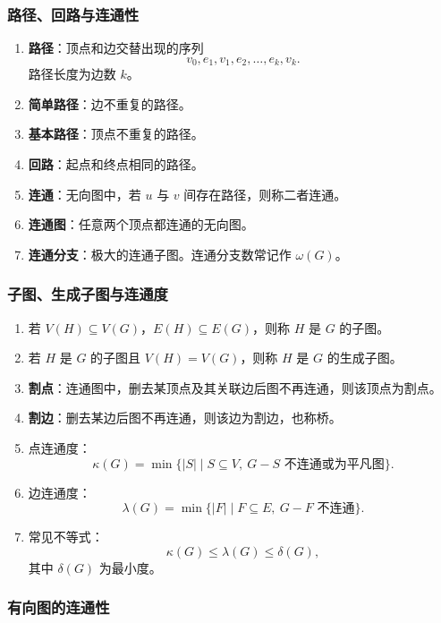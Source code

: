 \subsubsection{路径、回路与连通性}

\begin{enumerate}
	\item \textbf{路径}：顶点和边交替出现的序列
	\[
	v_0,e_1,v_1,e_2,\dots,e_k,v_k.
	\]
	路径长度为边数 \(k\)。
	\item \textbf{简单路径}：边不重复的路径。
	\item \textbf{基本路径}：顶点不重复的路径。
	\item \textbf{回路}：起点和终点相同的路径。
	\item \textbf{连通}：无向图中，若 \(u\) 与 \(v\) 间存在路径，则称二者连通。
	\item \textbf{连通图}：任意两个顶点都连通的无向图。
	\item \textbf{连通分支}：极大的连通子图。连通分支数常记作 \(\omega(G)\)。
\end{enumerate}

\subsubsection{子图、生成子图与连通度}

\begin{enumerate}
	\item 若 \(V(H)\subseteq V(G)\)，\(E(H)\subseteq E(G)\)，则称 \(H\) 是 \(G\) 的子图。
	\item 若 \(H\) 是 \(G\) 的子图且 \(V(H)=V(G)\)，则称 \(H\) 是 \(G\) 的生成子图。
	\item \textbf{割点}：连通图中，删去某顶点及其关联边后图不再连通，则该顶点为割点。
	\item \textbf{割边}：删去某边后图不再连通，则该边为割边，也称桥。
	\item 点连通度：
	\[
	\kappa(G)=\min\{|S|\mid S\subseteq V,\ G-S\text{ 不连通或为平凡图}\}.
	\]
	\item 边连通度：
	\[
	\lambda(G)=\min\{|F|\mid F\subseteq E,\ G-F\text{ 不连通}\}.
	\]
	\item 常见不等式：
	\[
	\kappa(G)\le\lambda(G)\le\delta(G),
	\]
	其中 \(\delta(G)\) 为最小度。
\end{enumerate}

\subsubsection{有向图的连通性}

